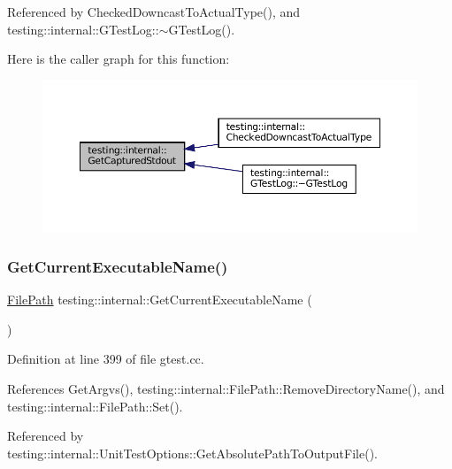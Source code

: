 Referenced by Checked\+Downcast\+To\+Actual\+Type(), and testing\+::internal\+::\+G\+Test\+Log\+::$\sim$\+G\+Test\+Log().

Here is the caller graph for this function\+:
\nopagebreak
\begin{figure}[H]
\begin{center}
\leavevmode
\includegraphics[width=350pt]{namespacetesting_1_1internal_aed657219a9856a8d249a3230de0c54ce_icgraph}
\end{center}
\end{figure}
\mbox{\label{namespacetesting_1_1internal_a7a2bbf069f75bc99873976ad6fc356ad}} 
\subsubsection{\texorpdfstring{Get\+Current\+Executable\+Name()}{GetCurrentExecutableName()}}
{\footnotesize\ttfamily \hyperlink{classtesting_1_1internal_1_1FilePath}{File\+Path} testing\+::internal\+::\+Get\+Current\+Executable\+Name (\begin{DoxyParamCaption}{ }\end{DoxyParamCaption})}



Definition at line 399 of file gtest.\+cc.



References Get\+Argvs(), testing\+::internal\+::\+File\+Path\+::\+Remove\+Directory\+Name(), and testing\+::internal\+::\+File\+Path\+::\+Set().



Referenced by testing\+::internal\+::\+Unit\+Test\+Options\+::\+Get\+Absolute\+Path\+To\+Output\+File().



